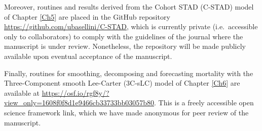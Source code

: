 \documentclass[Thesis]{subfiles}
\begin{document}
Moreover, routines and results derived from the Cohort STAD (C-STAD) model of Chapter \ref{Ch5} are placed in the GitHub repository \url{https://github.com/ubasellini/C-STAD}, which is currently private (i.e.~accessible only to collaborators) to comply with the guidelines of the journal where the manuscript is under review. Nonetheless, the repository will be made publicly available upon eventual acceptance of the manuscript. 

Finally, routines for smoothing, decomposing and forecasting mortality with the Three-Component smooth Lee-Carter (3C-sLC) model of Chapter \ref{Ch6} are available at \url{https://osf.io/rgf8y/?view_only=1608f0f8d1e9466cb33733bb03057b80}. This is a freely accessible open science framework link, which we have made anonymous for peer review of the manuscript. 

\cleardoublepage
\end{document}
